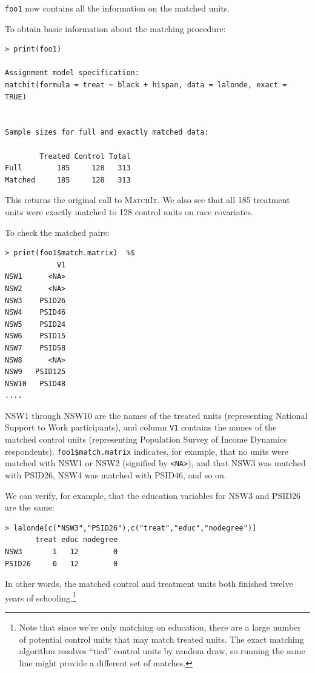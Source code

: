 \documentclass[oneside,letterpaper,titlepage]{article}
\newcommand{\MatchIt}{\textsc{MatchIt}}
\begin{document}
\texttt{foo1} now contains all the information on the matched units.  

To obtain basic information about the matching procedure: 

\begin{verbatim}
> print(foo1) 

Assignment model specification:
matchit(formula = treat ~ black + hispan, data = lalonde, exact = TRUE)


Sample sizes for full and exactly matched data:

        Treated Control Total
Full        185     128   313
Matched     185     128   313
\end{verbatim}

This returns the original call to \MatchIt.  We also see that all 185
treatment units were exactly matched to 128 control units on race
covariates.  



To check the matched pairs:

\begin{verbatim}
> print(foo1$match.matrix)  %$
            V1
NSW1      <NA>
NSW2      <NA>
NSW3    PSID26
NSW4    PSID46
NSW5    PSID24
NSW6    PSID15
NSW7    PSID58
NSW8      <NA>
NSW9   PSID125
NSW10   PSID48
....
\end{verbatim}

NSW1 through NSW10 are the names of the treated units (representing
National Support to Work participants), and column
\texttt{V1} contains the names of the matched control units
(representing Population Survey of Income Dynamics respondents).
\texttt{foo1\$match.matrix} indicates, for example, that no units were
matched with NSW1 or NSW2 (signified by \texttt{<NA>}), and that NSW3
was matched with PSID26, NSW4 was matched with PSID46, and so on.  

We can verify, for example, that the education variables for NSW3 and
PSID26 are the same:

\begin{verbatim}
> lalonde[c("NSW3","PSID26"),c("treat","educ","nodegree")]
       treat educ nodegree
NSW3       1   12        0
PSID26     0   12        0
\end{verbatim}

In other words, the matched control and treatment units both finished
twelve years of schooling.\footnote{Note that since we're only
  matching on education, there are a large number of potential control
  units that may match treated units.  The exact matching algorithm
  resolves ``tied'' control units by random draw, so running the same
  line might provide a different set of matches.}
\end{document}
